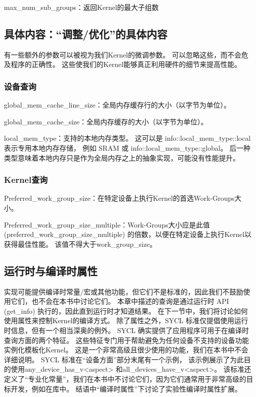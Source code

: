 max\_num\_sub\_groups：返回Kernel的最大子组数

\subsection{具体内容：“调整/优化”的具体内容}
有一些额外的参数可以被视为我们Kernel的微调参数。 
可以忽略这些，而不会危及程序的正确性。 这些使我们的Kernel能够真正利用硬件的细节来提高性能。

\subsubsection{设备查询}
global\_mem\_cache\_line\_size：全局内存缓存行的大小（以字节为单位）。

global\_mem\_cache\_size：全局内存缓存的大小（以字节为单位）。 

local\_mem\_type：支持的本地内存类型。 这可以是 info::local\_mem\_type::local 表示专用本地内存存储，
例如 SRAM 或 info::local\_mem\_type::global。 
后一种类型意味着本地内存只是作为全局内存之上的抽象实现，可能没有性能提升。

\subsubsection{Kernel查询}
Preferred\_work\_group\_size：在特定设备上执行Kernel的首选Work-Groups大小。

Preferred\_work\_group\_size\_multiple：Work-Groups大小应是此值 (preferred\_work\_group\_size\_multiple) 的倍数，以便在特定设备上执行Kernel以获得最佳性能。 
该值不得大于work\_group\_size。

\subsection{运行时与编译时属性}
实现可能提供编译时常量/宏或其他功能，但它们不是标准的，因此我们不鼓励使用它们，也不会在本书中讨论它们。 
本章中描述的查询是通过运行时 API (get\_info) 执行的，因此直到运行时才知道结果。 
在下一节中，我们将讨论如何使用属性来控制Kernel的编译方式。 
除了属性之外，SYCL 标准仅提倡使用运行时信息，但有一个相当深奥的例外。 
SYCL 确实提供了应用程序可用于在编译时查询方面的两个特征。 
这些特征专门用于帮助避免为任何设备不支持的设备功能实例化模板化Kernel。 
这是一个非常高级且很少使用的功能，我们在本书中不会详细说明。 
SYCL 标准在“设备方面”部分末尾有一个示例，
该示例展示了为此目的使用any\_device\_has\_v<aspect> 和all\_devices\_have\_v<aspect>。 
该标准还定义了“专业化常量”，我们在本书中不讨论它们，因为它们通常用于非常高级的目标开发，例如在库中。 
结语中“编译时属性”下讨论了实验性编译时属性扩展。

